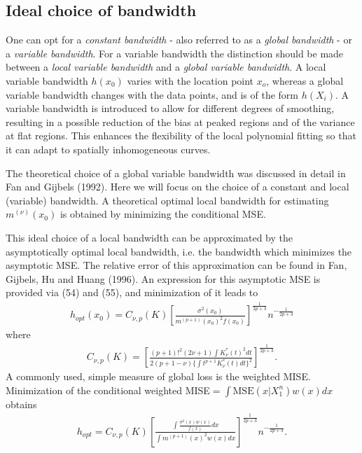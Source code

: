 \documentclass[12pt]{article}
\renewcommand{\=}[1]{\stackrel{#1}{=}} %
\theoremstyle{definition}
\begin{document}
\subsection{Ideal choice of bandwidth}
	One can opt for a \textit{constant bandwidth} - also referred to as a \textit{global bandwidth} - or a \textit{variable bandwidth}. For a variable bandwidth the distinction should be made between a \textit{local variable bandwidth} and a \textit{global variable bandwidth}. A local variable bandwidth $h(x_0)$ varies with the location point $x_o$, whereas a global variable bandwidth changes with the data points, and is of the form $h(X_i)$. A variable bandwidth is introduced to allow for different degrees of smoothing, resulting in a possible reduction of the bias at peaked regions and of the variance at flat regions. This enhances the flexibility of the local polynomial fitting so that it can adapt to spatially inhomogeneous curves.
	
	The theoretical choice of a global variable bandwidth was discussed in detail in Fan and Gijbels (1992). Here we will focus on the choice of a constant and local (variable) bandwidth. A theoretical optimal local bandwidth for estimating $m^{(\nu)}(x_0)$ is obtained by minimizing the conditional MSE.
	
	This ideal choice of a local bandwidth can be approximated by the asymptotically optimal local bandwidth, i.e. the bandwidth which minimizes the asymptotic MSE. The relative error of this approximation can be found in Fan, Gijbels, Hu and Huang (1996). An expression for this asymptotic MSE is provided via (54) and (55), and minimization of it leads to 
	\begin{align}
	h_{opt}(x_0)=C_{\nu,p}(K)\left[\frac{\sigma^2(x_0)}{m^{(p+1)}(x_0)^2f(x_0)}\right]^{\frac{1}{2p+3}}n^{-\frac{1}{2p+3}}
	\end{align}where
	\begin{align}
	C_{\nu,p}(K)=\left[\frac{(p+1)!^2(2\nu+1)\int K_{\nu}^*(t)^2dt}{2(p+1-\nu)\{\int t^{p+1}K_{\nu}^*(t)dt\}^2}\right]^{\frac{1}{2p+3}}.
	\end{align}
	A commonly used, simple measure of global loss is the weighted MISE. Minimization of the conditional weighted MISE$=\int\textrm{MSE}(x|X_1^n)w(x)dx$ obtains
	\begin{align}
	h_{opt}=C_{\nu,p}(K)\left[\frac{\int\frac{\sigma^2(x)w(x)}{f(x)}dx}{\int m^{(p+1)}(x)^2w(x)dx}\right]^{\frac{1}{2p+3}}n^{-\frac{1}{2p+3}}.
	\end{align}
\end{document}
